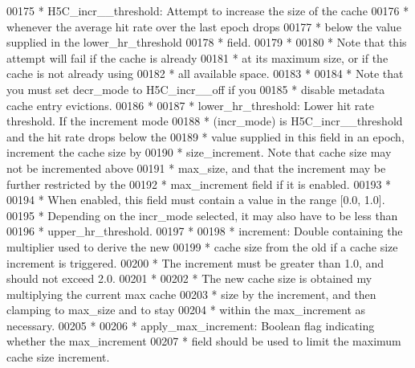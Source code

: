 \begin{DoxyCode}
00175 \textcolor{comment}{ *      H5C\_incr\_\_threshold: Attempt to increase the size of the cache}
00176 \textcolor{comment}{ *              whenever the average hit rate over the last epoch drops}
00177 \textcolor{comment}{ *              below the value supplied in the lower\_hr\_threshold}
00178 \textcolor{comment}{ *              field.}
00179 \textcolor{comment}{ *}
00180 \textcolor{comment}{ *              Note that this attempt will fail if the cache is already}
00181 \textcolor{comment}{ *              at its maximum size, or if the cache is not already using}
00182 \textcolor{comment}{ *              all available space.}
00183 \textcolor{comment}{ *}
00184 \textcolor{comment}{ *      Note that you must set decr\_mode to H5C\_incr\_\_off if you}
00185 \textcolor{comment}{ *      disable metadata cache entry evictions.}
00186 \textcolor{comment}{ *}
00187 \textcolor{comment}{ * lower\_hr\_threshold: Lower hit rate threshold.  If the increment mode}
00188 \textcolor{comment}{ *      (incr\_mode) is H5C\_incr\_\_threshold and the hit rate drops below the}
00189 \textcolor{comment}{ *      value supplied in this field in an epoch, increment the cache size by}
00190 \textcolor{comment}{ *      size\_increment.  Note that cache size may not be incremented above}
00191 \textcolor{comment}{ *      max\_size, and that the increment may be further restricted by the}
00192 \textcolor{comment}{ *      max\_increment field if it is enabled.}
00193 \textcolor{comment}{ *}
00194 \textcolor{comment}{ *      When enabled, this field must contain a value in the range [0.0, 1.0].}
00195 \textcolor{comment}{ *      Depending on the incr\_mode selected, it may also have to be less than}
00196 \textcolor{comment}{ *      upper\_hr\_threshold.}
00197 \textcolor{comment}{ *}
00198 \textcolor{comment}{ * increment:  Double containing the multiplier used to derive the new}
00199 \textcolor{comment}{ *      cache size from the old if a cache size increment is triggered.}
00200 \textcolor{comment}{ *      The increment must be greater than 1.0, and should not exceed 2.0.}
00201 \textcolor{comment}{ *}
00202 \textcolor{comment}{ *      The new cache size is obtained my multiplying the current max cache}
00203 \textcolor{comment}{ *      size by the increment, and then clamping to max\_size and to stay}
00204 \textcolor{comment}{ *      within the max\_increment as necessary.}
00205 \textcolor{comment}{ *}
00206 \textcolor{comment}{ * apply\_max\_increment:  Boolean flag indicating whether the max\_increment}
00207 \textcolor{comment}{ *      field should be used to limit the maximum cache size increment.}

\end{DoxyCode}
